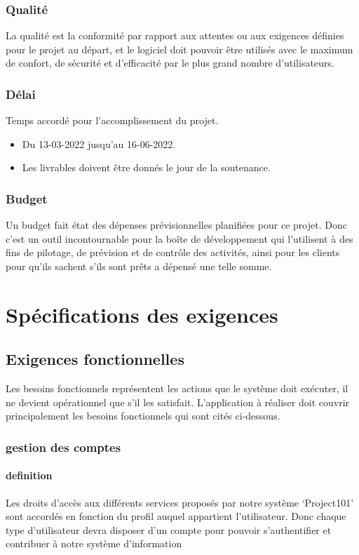 \documentclass[11pt,fleqn]{book} %
\begin{document}
\subsection{Qualité}
La qualité est la conformité par rapport aux attentes ou aux exigences définies pour le 
projet au départ, et le logiciel doit pouvoir être utilisés avec le maximum de confort, de 
sécurité et d’efficacité par le plus grand nombre d’utilisateurs.
\subsection{Délai}
Temps accordé pour l'accomplissement du projet.
\begin{itemize}
    \item Du 13-03-2022 jusqu’au 16-06-2022.
    \item Les livrables doivent être donnés le jour de la soutenance.
\end{itemize}
\subsection{Budget}
Un budget fait état des dépenses prévisionnelles planifiées pour ce projet. Donc c’est un outil incontournable pour la boîte de développement qui l'utilisent à des fins de pilotage, de prévision et de contrôle des activités, ainsi pour les clients pour qu’ils sachent s’ils sont prêts a dépensé une telle somme.
\chapter{Spécifications des exigences}
\section{Exigences fonctionnelles}
Les besoins fonctionnels représentent les actions que le système doit exécuter, il ne devient opérationnel que s’il les satisfait. L’application à réaliser doit couvrir principalement les besoins fonctionnels qui sont cités ci-dessous.
\subsection{gestion des comptes}
\subsubsection{definition}
Les droits d’accès aux différents services proposés par notre système ‘Project101’ sont accordés en fonction du profil auquel appartient l’utilisateur. Donc chaque type d’utilisateur devra disposer d’un compte pour pouvoir s’authentifier et contribuer à notre système d’information
\end{document}
